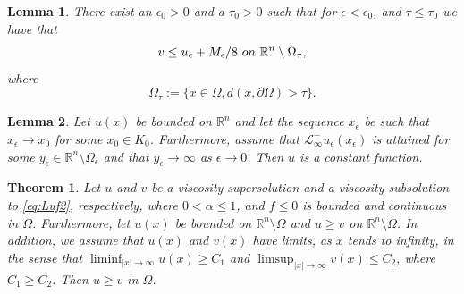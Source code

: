 \documentclass[10pt,a4paper]{amsart}
\newtheorem{lem}{Lemma}
\newtheorem{thm}{Theorem}
\providecommand{\Lneg}{\mathcal{L}_{\infty}^-}
\providecommand{\Rn}{\mathbb{R}^n}
\begin{document}
\begin{lem}\label{lem:A3}
    There exist an $\epsilon_0>0$ and a $\tau_0 >0$ such that for $\epsilon < \epsilon_0$, and $\tau \leq \tau_0$ we have that
\begin{equation}
\label{eq:blahblah2}
v \leq u_{\epsilon} + M_{\epsilon}/8 \ \textup{ on } \ \Rn \setminus \Omega_{\tau},   
\end{equation}
where
$$
\Omega_{\tau}:= \{ x \in \Omega, d(x, \partial \Omega)> \tau \}. 
$$
\end{lem}

\begin{lem}\label{lem:A4}
    Let $u(x)$ be bounded on $ \Rn$ and let the sequence $x_{\epsilon} $ be such that $x_{\epsilon} \rightarrow x_0$ for some $x_0 \in K_0$. Furthermore, assume that $\Lneg u_{\epsilon}(x_{\epsilon})$ is attained for some $y_{\epsilon} \in \Rn \setminus \Omega_{\epsilon}$ and that $y_{\epsilon} \to \infty$ as $\epsilon \to 0$. Then $u$ is a constant function.
\end{lem}

\begin{thm}\label{thm:comparison}
    Let $u$ and $v$ be a viscosity supersolution and a viscosity subsolution to \eqref{eq:Luf2}, respectively, where $0 < \alpha  \leq 1$, and $f \leq 0$ is bounded and continuous in $\Omega$. Furthermore, let $u(x)$ be bounded on $ \Rn \setminus \Omega$ and $u \geq v$ on $\Rn \setminus \Omega$. In addition, we assume that $u(x)$ and $v(x)$ have limits, as $x$ tends to infinity, in the sense that $\liminf_{|x| \to \infty} u(x) \geq C_1$ and $\limsup_{|x| \to \infty} v(x) \leq C_2$, where $C_1 \geq C_2$. Then $u \geq v$ in $\Omega$.
\end{thm}
\end{document}
